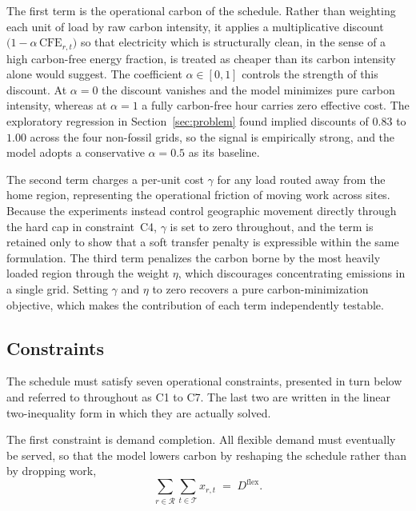 The first term is the operational carbon of the schedule. Rather than weighting each unit of load by raw carbon intensity, it applies a multiplicative discount $\bigl(1 - \alpha\,\text{CFE}_{r,t}\bigr)$ so that electricity which is structurally clean, in the sense of a high carbon-free energy fraction, is treated as cheaper than its carbon intensity alone would suggest. The coefficient $\alpha \in [0,1]$ controls the strength of this discount. At $\alpha = 0$ the discount vanishes and the model minimizes pure carbon intensity, whereas at $\alpha = 1$ a fully carbon-free hour carries zero effective cost. The exploratory regression in Section~\ref{sec:problem} found implied discounts of $0.83$ to $1.00$ across the four non-fossil grids, so the signal is empirically strong, and the model adopts a conservative $\alpha = 0.5$ as its baseline.

The second term charges a per-unit cost $\gamma$ for any load routed away from the home region, representing the operational friction of moving work across sites. Because the experiments instead control geographic movement directly through the hard cap in constraint~C4, $\gamma$ is set to zero throughout, and the term is retained only to show that a soft transfer penalty is expressible within the same formulation. The third term penalizes the carbon borne by the most heavily loaded region through the weight $\eta$, which discourages concentrating emissions in a single grid. Setting $\gamma$ and $\eta$ to zero recovers a pure carbon-minimization objective, which makes the contribution of each term independently testable.

\subsection{Constraints}
\label{sec:form-constraints}

The schedule must satisfy seven operational constraints, presented in turn below and referred to throughout as C1 to C7. The last two are written in the linear two-inequality form in which they are actually solved.

The first constraint is demand completion. All flexible demand must eventually be served, so that the model lowers carbon by reshaping the schedule rather than by dropping work,
\begin{equation}
\sum_{r \in \mathcal{R}} \sum_{t \in \mathcal{T}} x_{r,t} \;=\; D^{\text{flex}}. \tag{C1}\label{eq:c1}
\end{equation}

